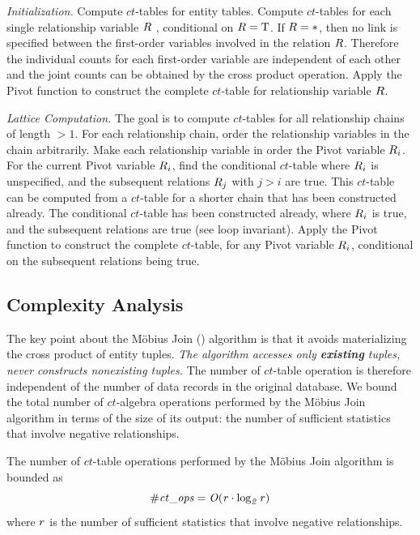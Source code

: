 \documentclass{sig-alternate-2013}
\newcommand{\ct}{\mathit{ct}}
\begin{document}
{\em Initialization.} Compute $\ct$-tables for entity tables.
Compute $\ct$-tables for each single relationship variable $R$ , conditional on $R = \mathrm{T}$. %
If $R = \ast$, then no link is specified between the first-order variables involved in the relation $R$. Therefore the individual counts for each first-order variable are independent of each other and the joint counts can be obtained by the cross product operation. %
Apply the Pivot function to construct the  complete $\ct$-table for relationship variable $R$. %

{\em Lattice Computation.} The goal is to compute $\ct$-tables for all relationship chains of length $>1$. For each relationship chain, order the relationship variables in the chain arbitrarily. Make each relationship variable in order the Pivot variable $R_{i}$. For the current Pivot variable $R_{i}$, find the conditional $\ct$-table where $R_{i}$ is unspecified, and the subsequent relations $R_{j}$ with $j>i$ are true. This $\ct$-table can be computed from a $ct$-table for a shorter chain that has been constructed already. The conditional $ct$-table   has been constructed already, where $R_{i}$ is true, and the subsequent relations are true (see loop invariant). Apply the Pivot function to construct the  complete $\ct$-table, for any Pivot variable $R_{i}$,  conditional on the subsequent relations being true. 


\subsection{Complexity Analysis} \label{sec:complexity} 
The key point about the M\"obius Join (\MJ) algorithm %
is that it avoids materializing the cross product of entity tuples. {\em The algorithm accesses  only \textbf{existing} tuples, never constructs nonexisting tuples.} The number of $\ct$-table operation is therefore independent of the number of data records in the original database. We bound the total number of $\ct$-algebra operations performed by the M\"obius Join algorithm in terms of the size of its output: the number of sufficient statistics that involve negative relationships. 
%
\begin{proposition}
The number of $\ct$-table operations performed by the M\"obius Join algorithm is bounded as $$\it{\# \ct\_\it{ops}} = O(r \cdot \log_{2} r)$$ where $r$ is the number of sufficient statistics that involve negative relationships.
\end{proposition}
\end{document}
